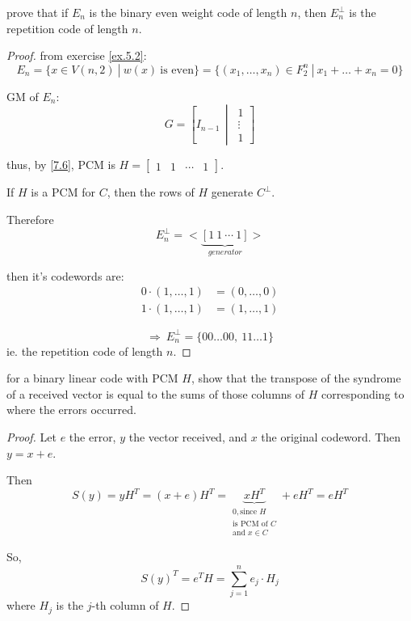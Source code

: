 \documentclass{article}
\theoremstyle{definition}
\newenvironment{ex}[1]
{\renewcommand\theinnerex{#1}\innerex}
{\endinnerex}
\begin{document}
\begin{ex}{7.2}
  prove that if $E_n$ is the binary even weight code of length $n$, then
  $E_n^\perp$ is the repetition code of length $n$.
\end{ex}
\begin{proof}
  from exercise \ref{ex.5.2}:
  $$E_n = \{ x \in V(n,2) ~|~ w(x) ~\text{is even} \} = \{ (x_1, \ldots, x_n) \in F_2^n ~|~ x_1 + \ldots + x_n = 0 \}$$

  GM of $E_n$:
  $$G = \left[ I_{n-1} \,\middle|\, 
  \begin{matrix}
    1 \\ \vdots \\ 1
  \end{matrix}
  \right]$$

  thus, by \ref{7.6}, PCM is $H=\begin{bmatrix}1&1&\cdots&1\end{bmatrix}$.

  If $H$ is a PCM for $C$, then the rows of $H$ generate $C^\perp$.

  Therefore
  $$E_n^\perp = <\underbrace{[1~1~\cdots~1]}_{generator}>$$

  then it's codewords are:
  \begin{align*}
    0 \cdot (1, \ldots, 1) &= (0, \ldots, 0)\\
    1 \cdot (1, \ldots, 1) &= (1, \ldots, 1)
  \end{align*}

  $$\Longrightarrow~ E_n^\perp = \{00\ldots 00,~ 11 \ldots 1 \}$$
  ie. the repetition code of length $n$.
\end{proof}

\begin{ex}{7.4}
  for a binary linear code with PCM $H$, show that the transpose of the syndrome of a received vector is equal to the sums of those columns of $H$ corresponding to where the errors occurred.
\end{ex}
\begin{proof}
  Let $e$ the error, $y$ the vector received, and $x$ the original codeword. Then $y=x+e$.

  Then
  $$S(y) = y H^T = (x+e)H^T = \underbrace{xH^T}_{\substack{0, \text{since $H$}\\ \text{is PCM of $C$}\\ \text{and $x\in C$}}} + eH^T = e H^T$$

  So,
  $$S(y)^T = e^T H = \sum_{j=1}^n e_j \cdot H_j$$
  where $H_j$ is the $j$-th column of $H$.
\end{proof}
\end{document}
